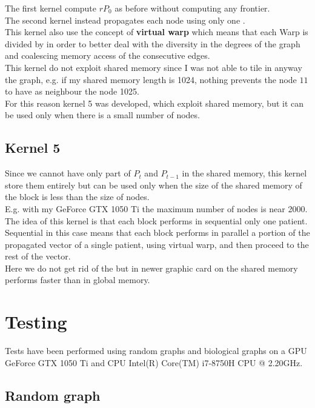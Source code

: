 \documentclass[a4paper]{article}
\begin{document}
The first kernel compute $rP_0$ as before without computing any frontier.\\
The second kernel instead propagates each node using only one
.\\
This kernel also use the concept of \textbf{virtual warp} which means that each Warp is 
divided by  in order to better deal with the diversity in the
degrees of the graph and coalescing memory access of the 
consecutive edges.\\
This kernel do not exploit shared memory since I was not able to tile in anyway
the graph, e.g. if my shared memory length is 1024, nothing prevents the node
$11$ to have as neighbour the node 1025.\\
For this reason kernel 5 was developed, which exploit shared memory, but it can be 
used only when there is a small number of nodes.

\subsection{Kernel 5}
Since we cannot have only part of $P_t$ and $P_{t-1}$ in the shared memory, this
kernel store them entirely but can be used only when the size of the shared memory of 
the block is less than the size of nodes.\\
E.g. with my GeForce GTX 1050 Ti the maximum number of nodes is near 2000.\\
The idea of this kernel is that each block performs in sequential only one
patient.\\
Sequential in this case means that each block performs in parallel a
portion of the propagated vector of a single patient, using virtual warp,
and then proceed to the rest of the vector.\\
Here we do not get rid of the  but in newer graphic card
 on the shared memory performs faster than in global memory.

\newpage
\section{Testing}
Tests have been performed using random graphs and biological graphs on a GPU
GeForce GTX 1050 Ti and CPU Intel(R) Core(TM) i7-8750H CPU @ 2.20GHz.

\subsection{Random graph}
\end{document}
